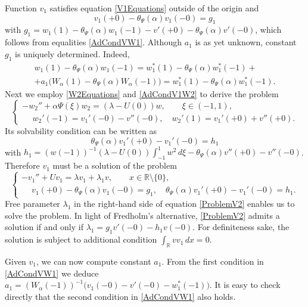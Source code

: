 \documentclass[11pt,english]{amsart}%
\begin{document}
Function $v_1$ satisfies  equation \eqref{V1Equations} outside of the origin and
\begin{equation*}
    v_1(+0)-\theta_\Psi(\alpha)v_1(-0)=g_1
\end{equation*}
with $g_1=w_1(1)-\theta_\Psi(\alpha)w_1(-1)-v '(+0)-\theta_\Psi(\alpha)v '(-0)$, which follows from equalities \eqref{AdCondVW1}.
Although $a_1$ is as yet unknown, constant $g_1$ is uniquely determined. Indeed,
\begin{multline*}
    w_1(1)-\theta_\Psi(\alpha)w_1(-1)=w_1^*(1)-\theta_\Psi(\alpha)w_1^*(-1)+\\
    +a_1\bigl(W_\alpha(1)-\theta_\Psi(\alpha)W_\alpha(-1)\bigr)=w_1^*(1)-\theta_\Psi(\alpha)w_1^*(-1).
\end{multline*}
Next we employ \eqref{W2Equations} and \eqref{AdCondV1W2} to derive the problem
\begin{equation}\label{W2Problem}
\begin{cases}
-w_2''+\alpha\Psi(\xi)w_2=(\lambda-U(0))w ,\qquad \xi\in(-1,1),\\
\phantom{-}w_2'(-1)=v_1'(-0)-v ''(-0),\quad w_2'(1)=v_1'(+0)+v ''(+0).
\end{cases}
\end{equation}
Its solvability condition can be written as
\begin{equation}\label{SolvabilityW2}
    \theta_\Psi(\alpha)v_1'(+0)-v_1'(-0)=h_1
\end{equation}
with $h_1=(w(-1))^{-1}(\lambda -U(0))\int_{-1}^1w^2\,d\xi -\theta_\Psi(\alpha)v ''(+0)-v ''(-0)$.
Therefore  $v_1$ must be a solution of the problem
\begin{equation}\label{ProblemV2}
\begin{cases}
    -v_1''+Uv_1=\lambda v_1+\lambda_1v,\qquad x\in\mathbb R\setminus\{0\},\\
    \phantom{-}v_1(+0)-\theta_\Psi(\alpha)v_1(-0)=g_1,\quad \theta_\Psi(\alpha)v_1'(+0)-v_1'(-0)=h_1.
\end{cases}
\end{equation}
Free parameter $\lambda_1$ in the right-hand side of equation \eqref{ProblemV2} enables us to solve the problem.
In light of Fredholm's alternative, \eqref{ProblemV2} admits a solution if and only if
$\lambda_1=g_1v '(-0)-h_1v (-0)$. For definiteness sake, the solution is subject to additional condition
$\int_{\mathbb{R}}v v_1\,dx=0$.

Given $v_1$, we can now compute constant $a_1$. From the first condition in \eqref{AdCondVW1} we deduce  $a_1=(W_\alpha(-1))^{-1}\bigl(v_1(-0)-v'(-0)-w_1^*(-1)\bigr)$. It is easy to check directly that the second condition in \eqref{AdCondVW1} also holds.
\end{document}
